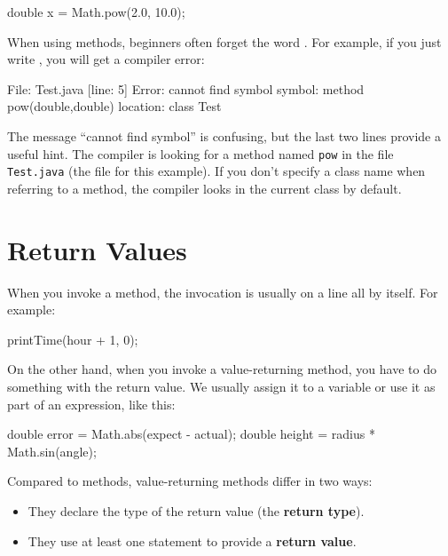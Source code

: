 \begin{code}
double x = Math.pow(2.0, 10.0);
\end{code}

When using  methods, beginners often forget the word .
For example, if you just write , you will get a compiler error:

\begin{stdout}
File: Test.java  [line: 5]
Error: cannot find symbol
  symbol:   method pow(double,double)
  location: class Test
\end{stdout}

The message ``cannot find symbol'' is confusing, but the last two lines provide a useful hint.
The compiler is looking for a method named {\tt pow} in the file {\tt Test.java} (the file for this example).
If you don't specify a class name when referring to a method, the compiler looks in the current class by default.


\section{Return Values}


When you invoke a  method, the invocation is usually on a line all by itself.
For example:

\begin{code}
printTime(hour + 1, 0);
\end{code}

On the other hand, when you invoke a value-returning method, you have to do something with the return value.
We usually assign it to a variable or use it as part of an expression, like this:

\begin{code}
double error = Math.abs(expect - actual);
double height = radius * Math.sin(angle);
\end{code}


Compared to  methods, value-returning methods differ in two ways:


\begin{itemize}

\item They declare the type of the return value (the {\bf return type}).

\item They use at least one  statement to provide a {\bf return value}.

\end{itemize}


